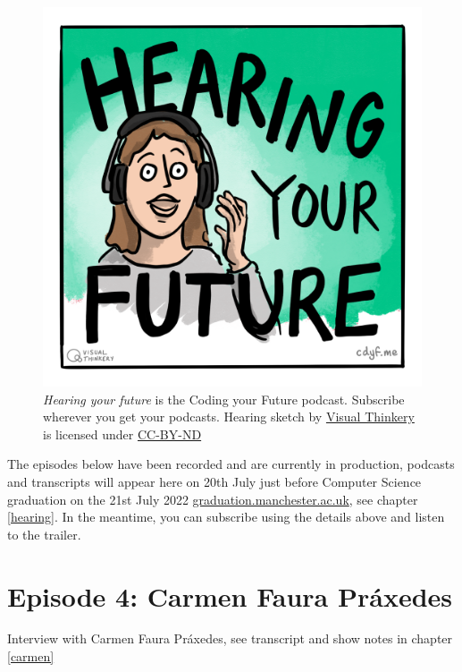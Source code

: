\documentclass[
]{book}
\begin{document}
\begin{figure}

{\centering \includegraphics[width=1\linewidth]{images/Hearing-your-future} 

}

\caption{\emph{Hearing your future} is the Coding your Future podcast. Subscribe wherever you get your podcasts. Hearing sketch by \href{https://visualthinkery.com/}{Visual Thinkery} is licensed under \href{https://creativecommons.org/licenses/by-nd/4.0/}{CC-BY-ND}}\label{fig:hearing-fig}
\end{figure}



The episodes below have been recorded and are currently in production, podcasts and transcripts will appear here on 20th July just before Computer Science graduation on the 21st July 2022 \href{http://www.graduation.manchester.ac.uk/}{graduation.manchester.ac.uk}, see chapter \ref{hearing}. In the meantime, you can subscribe using the details above and listen to the trailer.

\hypertarget{ep4}{%
\section{Episode 4: Carmen Faura Práxedes}\label{ep4}}

Interview with Carmen Faura Práxedes, see transcript and show notes in chapter \ref{carmen}
\end{document}
